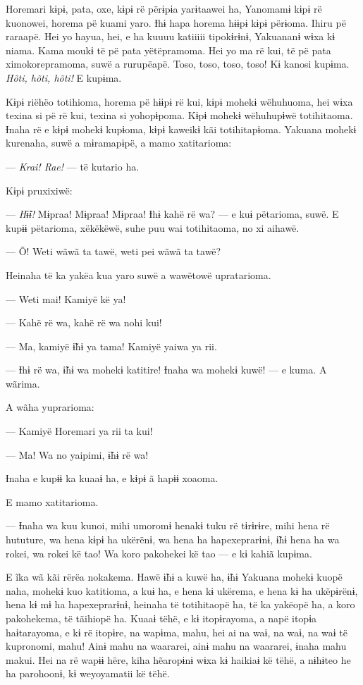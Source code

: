 Horemari kɨpɨ, pata, oxe, kɨpɨ rë përɨpɨa yarɨtaawei ha, Yanomamɨ kɨpɨ
rë kuonowei, horema pë kuami yaro. Ɨhɨ hapa horema hɨɨpɨ kɨpɨ përɨoma.
Ihiru pë raraapë. Hei yo hayua, hei, e ha kuuuu katiiiii tipokɨrɨnɨ,
Yakuananɨ wɨxa kɨ niama. Kama moukɨ të pë pata yëtëpramoma. Hei yo ma rë
kui, të pë pata ximokorepramoma, suwë a rurupëapë. Toso, toso, toso,
toso! Kɨ kanosi kupɨma. \textit{Hõti, hõti, hõti!} E kupɨma. 

Kɨpɨ riëhëo totihioma, horema pë hɨɨpɨ rë kui, kɨpɨ mohekɨ wëhuhuoma,
hei wɨxa texina si pë rë kui, texina si yohopɨpoma. Kɨpɨ mohekɨ
wëhuhupɨwë totihitaoma. Ɨnaha rë e kɨpɨ mohekɨ kupɨoma, kɨpɨ kaweikɨ kãi
totihitapɨoma. Yakuana mohekɨ kurenaha, suwë a mɨramapɨpë, a mamo
xatitarioma: 

--- \textit{Krai! Rae!} --- të kutario ha. 

Kɨpɨ pruxixiwë: 

--- \textit{Hɨ̃ɨ!} Mɨpraa! Mɨpraa! Mɨpraa! Ɨhɨ kahë rë wa? --- e kuɨ pëtarioma,
suwë. E kupɨɨ pëtarioma, xëkëkëwë, suhe puu wai totihitaoma, no xi
aihawë. 

--- Õ! Weti wãwã ta tawë, weti pei wãwã ta tawë?

Heinaha të ka yakëa kua yaro suwë a wawëtowë upratarioma. 

--- Weti mai! Kamiyë kë ya!

--- Kahë rë wa, kahë rë wa nohi kui!

--- Ma, kamiyë ɨ̃hɨ ya tama! Kamiyë yaiwa ya rii.

--- Ɨhɨ rë wa, ɨ̃hɨ wa mohekɨ katitire! Ɨnaha wa mohekɨ kuwë! --- e kuma.
A wãrima. 

A wãha yuprarioma: 

--- Kamiyë Horemari ya rii ta kui!

--- Ma! Wa no yaipimi, ɨ̃hɨ rë wa! 

Ɨnaha e kupɨɨ ka kuaaɨ ha, e kɨpɨ ã hapɨɨ xoaoma. 

E mamo xatitarioma. 

--- Ɨnaha wa kuu kunoi, mihi umoromɨ henakɨ tuku rë tɨrɨrɨre, mihi hena
rë hututure, wa hena kɨpɨ ha ukërënɨ, wa hena ha hapexeprarɨnɨ, ɨ̃hɨ hena
ha wa rokei, wa rokei kë tao! Wa koro pakohekei kë tao --- e kɨ kahiã
kupɨma.

E ĩka wã kãi rërëa nokakema. Hawë ɨ̃hɨ a kuwë ha, ɨ̃hɨ Yakuana mohekɨ
kuopë naha, mohekɨ kuo katitioma, a kuɨ ha, e hena kɨ ukërema, e hena kɨ
ha ukëpɨrënɨ, hena kɨ mɨ ha hapexeprarɨnɨ, heinaha të totihitaopë ha, të
ka yakëopë ha, a koro pakohekema, të tãihiopë ha. Kuaaɨ tëhë, e kɨ
itopɨrayoma, a napë itopɨa haɨtarayoma, e kɨ rë itopɨre, na wapɨma,
mahu, hei ai na waɨ, na waɨ, na waɨ të kupronomi, mahu! Ainɨ mahu na
waararei, ainɨ mahu na waararei, ɨnaha mahu makui. Hei na rë wapɨɨ hëre,
kiha hẽaropɨnɨ wɨxa kɨ haikiaɨ kë tëhë, a nɨhɨteo he ha parohoonɨ, kɨ
weyoyamatii kë tëhë. 

